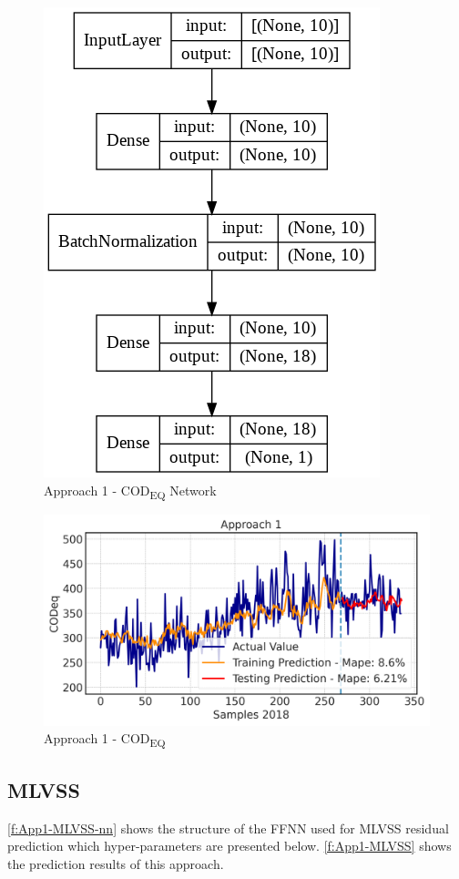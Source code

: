 \begin{figure}[h]
\centering
\includegraphics[width=0.4\linewidth]{figures/Ch5/App1_CODd.png}
\caption{Approach 1 - COD\textsubscript{EQ} Network}
\label{f:App1-codeq-nn}
\end{figure}

\begin{figure}[h]
\centering
\includegraphics[width=\linewidth]{figures/Ch5/CODeq-1.png}
\caption{Approach 1 - COD\textsubscript{EQ}}
\label{f:App1-codeq}
\end{figure}

\subsection{MLVSS}

\autoref{f:App1-MLVSS-nn} shows the structure of the \ac{FFNN} used for \ac{MLVSS} residual prediction which hyper-parameters are presented below. \autoref{f:App1-MLVSS} shows the prediction results of this approach.

